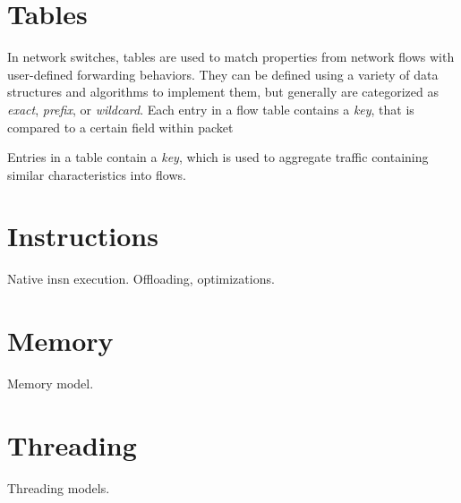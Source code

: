 \section{Tables}
\label{vm:tables}
In network switches, tables are used to match properties from network flows 
with user-defined forwarding behaviors. They can be defined using a variety of
data structures and algorithms to implement them, but generally are categorized
as \emph{exact}, \emph{prefix}, or \emph{wildcard}. Each entry in a flow table
contains a \emph{key}, that is compared to a certain field within packet

Entries in a table contain a \emph{key}, which is used to aggregate traffic 
containing similar characteristics into flows.


\section{Instructions}
\label{vm:insn}
Native insn execution. Offloading, optimizations.

\section{Memory}
\label{vm:memory}
Memory model.

\section{Threading}
\label{vm:threading}
Threading models.

